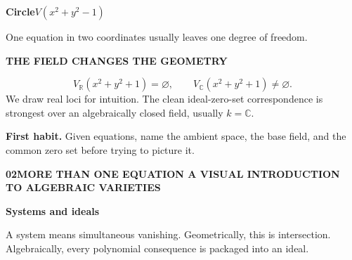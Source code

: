 \documentclass[9pt,a4paper]{extarticle}
\newcommand{\kk}{k}
\newcommand{\footertext}{ALGEBRAIC VARIETIES}
\newcommand{\pagehead}[3]{%
  {\fontsize{7.2}{8}\selectfont\bfseries\color{teal}#1\quad #2\hfill
   \normalfont\color{muted}A VISUAL INTRODUCTION TO ALGEBRAIC VARIETIES}\par
  \vspace{2.5pt}{\color{line}\hrule height 0.45pt}\vspace{8pt}
  {\fontsize{21}{23}\selectfont\bfseries\color{navy}#3}\par\vspace{5pt}}
\newcommand{\lead}[1]{{\fontsize{11.2}{15.2}\selectfont #1\par}\vspace{6pt}}
\newcommand{\eyebrow}[1]{{\fontsize{7.2}{8}\selectfont\bfseries\color{teal}\MakeUppercase{#1}}}
\begin{document}
\begin{minipage}[t]{.316\textwidth}
\begin{quietbox}
\textbf{Circle}\hfill $V(x^2+y^2-1)$\par\vspace{2pt}
\begin{center}
\end{center}
One equation in two coordinates usually leaves one degree of freedom.
\end{quietbox}
\end{minipage}

\vspace{5pt}
\begin{goldbox}
\eyebrow{The field changes the geometry}\par\vspace{3pt}
\[
V_{\mathbb R}(x^2+y^2+1)=\varnothing,
\qquad
V_{\mathbb C}(x^2+y^2+1)\neq\varnothing.
\]
We draw real loci for intuition. The clean ideal-zero-set correspondence is strongest over an algebraically closed field, usually $\kk=\mathbb C$.
\end{goldbox}

\vspace{4pt}
\textbf{First habit.} Given equations, name the ambient space, the base field, and the common zero set before trying to picture it.
\newpage

\renewcommand{\footertext}{IDEALS / INTERSECTION AND UNION / RADICALS}
\pagehead{02}{MORE THAN ONE EQUATION}{Systems and ideals}
\lead{A system means simultaneous vanishing. Geometrically, this is intersection. Algebraically, every polynomial consequence is packaged into an ideal.}
\end{document}
